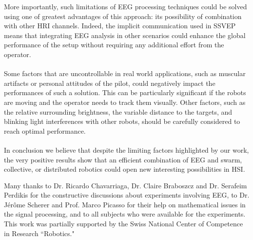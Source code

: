 \documentclass[smallextended]{svjour3}
\begin{document}
More importantly, such limitations of EEG processing techniques could be solved using one of greatest advantages of this approach: its possibility of combination with other HRI channels.
Indeed, the implicit communication used in SSVEP means that integrating EEG analysis in other scenarios could enhance the global performance of the setup without requiring any additional effort from the operator.\\
\\
Some factors that are uncontrollable in real world applications, such as muscular artifacts or personal attitudes of the pilot, could negatively impact the performances of such a solution.
This can be particularly significant if the robots are moving and the operator needs to track them visually. 
Other factors, such as the relative surrounding brightness, the variable distance to the targets, and blinking light interferences with other robots, should be carefully considered to reach optimal performance. \\
\\
In conclusion we believe that despite the limiting factors highlighted by our work, the very positive results show that an efficient combination of EEG and swarm, collective, or distributed robotics could open new interesting possibilities in HSI.\\




\begin{acknowledgement}
Many thanks to Dr. Ricardo Chavarriaga, Dr. Claire Braboszcz and Dr. Serafeim Perdikis for the constructive discussions about experiments involving EEG, to Dr. J\'er\^ome Scherer and Prof. Marco Picasso for their help on mathematical issues in the signal processing, and to all subjects who were available for the experiments. This work was partially supported by the Swiss National Center of Competence in Research ``Robotics."
\end{acknowledgement}


\end{document}
